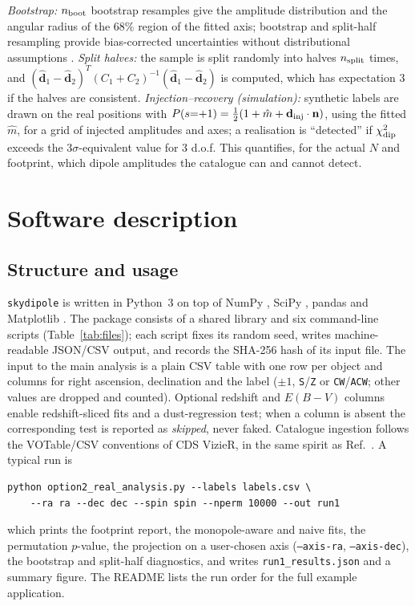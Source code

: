 \documentclass[preprint,12pt]{elsarticle}
\begin{document}
\emph{Bootstrap:} $n_{\rm boot}$ bootstrap resamples give the amplitude distribution and the angular radius of the $68\%$ region of the fitted axis; bootstrap and split-half resampling provide bias-corrected uncertainties without distributional assumptions \cite{Berg1992jack}.
\emph{Split halves:} the sample is split randomly into halves $n_{\rm split}$ times, and $(\hat{\mathbf{d}}_1 - \hat{\mathbf{d}}_2)^T(C_1+C_2)^{-1}(\hat{\mathbf{d}}_1 - \hat{\mathbf{d}}_2)$ is computed, which has expectation $3$ if the halves are consistent.
\emph{Injection--recovery (simulation):} synthetic labels are drawn on the real positions with $P(s{=}{+}1) = \tfrac12(1 + \hat m + \mathbf{d}_{\rm inj}\cdot\mathbf{n})$, using the fitted $\hat m$, for a grid of injected amplitudes and axes; a realisation is ``detected'' if $\chi^2_{\rm dip}$ exceeds the $3\sigma$-equivalent value for $3$ d.o.f.
This quantifies, for the actual $N$ and footprint, which dipole amplitudes the catalogue can and cannot detect.

\section{Software description}
\label{sec:software}

\subsection{Structure and usage}

\texttt{skydipole} is written in Python~3 \cite{Borcherds2007} on top of NumPy \cite{Harris2020}, SciPy \cite{Virtanen2020}, pandas \cite{McKinney2010} and Matplotlib \cite{Hunter2007}.
The package consists of a shared library and six command-line scripts (Table~\ref{tab:files}); each script fixes its random seed, writes machine-readable JSON/CSV output, and records the SHA-256 hash of its input file.
The input to the main analysis is a plain CSV table with one row per object and columns for right ascension, declination and the label ($\pm1$, \texttt{S}/\texttt{Z} or \texttt{CW}/\texttt{ACW}; other values are dropped and counted).
Optional redshift and $E(B{-}V)$ columns enable redshift-sliced fits and a dust-regression test; when a column is absent the corresponding test is reported as \emph{skipped}, never faked.
Catalogue ingestion follows the VOTable/CSV conventions of CDS VizieR, in the same spirit as Ref.~\cite{Varley2016}.
A typical run is
\begin{verbatim}
python option2_real_analysis.py --labels labels.csv \
    --ra ra --dec dec --spin spin --nperm 10000 --out run1
\end{verbatim}
which prints the footprint report, the monopole-aware and naive fits, the permutation $p$-value, the projection on a user-chosen axis (\texttt{--axis-ra}, \texttt{--axis-dec}), the bootstrap and split-half diagnostics, and writes \texttt{run1\_results.json} and a summary figure.
The README lists the run order for the full example application.
\end{document}
